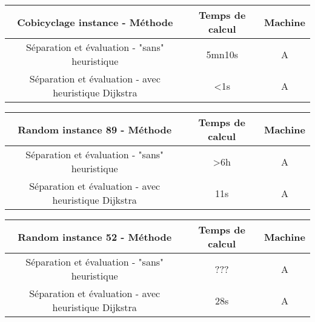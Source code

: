 \documentclass[french]{article}
\begin{document}
\begin{table}[h]
	\begin{center}
		{\renewcommand{\arraystretch}{3}
		\begin{tabular}{|c|c|c|}
			\hline
			\textbf{Cobicyclage instance - Méthode} & \textbf{Temps de calcul} & \textbf{Machine}\\
			\hline
			Séparation et évaluation - "sans" heuristique & 5mn10s & A\\
			\hline
			Séparation et évaluation - avec heuristique Dijkstra & <1s & A\\
			\hline
		\end{tabular}}
	\end{center}
\end{table}

\begin{table}[h]
	\begin{center}
		{\renewcommand{\arraystretch}{3}
		\begin{tabular}{|c|c|c|}
			\hline
			\textbf{Random instance 89 - Méthode} & \textbf{Temps de calcul} & \textbf{Machine}\\
			\hline
			Séparation et évaluation - "sans" heuristique & >6h & A\\
			\hline
			Séparation et évaluation - avec heuristique Dijkstra & 11s & A\\
			\hline
		\end{tabular}}
	\end{center}
\end{table}

\begin{table}[h]
	\begin{center}
		{\renewcommand{\arraystretch}{3}
		\begin{tabular}{|c|c|c|}
			\hline
			\textbf{Random instance 52 - Méthode} & \textbf{Temps de calcul} & \textbf{Machine}\\
			\hline
			Séparation et évaluation - "sans" heuristique & ??? & A\\
			\hline
			Séparation et évaluation - avec heuristique Dijkstra & 28s & A\\
			\hline
		\end{tabular}}
	\end{center}
\end{table}
\end{document}
